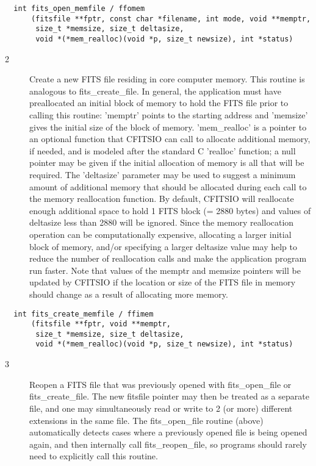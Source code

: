 \documentclass[11pt]{book}
\begin{document}
\begin{verbatim}
  int fits_open_memfile / ffomem
      (fitsfile **fptr, const char *filename, int mode, void **memptr,
       size_t *memsize, size_t deltasize,
       void *(*mem_realloc)(void *p, size_t newsize), int *status)
\end{verbatim}

\begin{description}
\item[2 ] Create a new FITS file residing in core computer memory.  This
routine is analogous to fits\_create\_file.    In general, the
application must have preallocated an initial block of memory to hold
the FITS file prior to calling this routine:  'memptr' points to the
starting address and 'memsize' gives the initial size of the block of
memory.  'mem\_realloc' is a pointer to an optional function that
CFITSIO can call to allocate additional memory, if needed, and is
modeled after the standard C 'realloc' function;  a null pointer may be
given if the initial allocation of memory is all that will be
required.  The 'deltasize' parameter may be used to suggest a minimum
amount of additional memory that should be allocated during each call
to the memory reallocation function.  By default, CFITSIO will
reallocate enough additional space to hold 1 FITS block (= 2880 bytes)
and  values of deltasize less than 2880 will be ignored.  Since the
memory reallocation operation can be computationally expensive,
allocating a larger initial block of memory, and/or specifying a larger
deltasize value may help to reduce the number of reallocation calls
and make the application program run
faster. Note that values of the memptr and memsize pointers will be updated
by CFITSIO if the location or size of the FITS file in memory
should change as a result of allocating more memory. \label{ffimem}
\end{description}

\begin{verbatim}
  int fits_create_memfile / ffimem
      (fitsfile **fptr, void **memptr,
       size_t *memsize, size_t deltasize,
       void *(*mem_realloc)(void *p, size_t newsize), int *status)
\end{verbatim}

\begin{description}
\item[3 ] Reopen a FITS file that was previously opened with
    fits\_open\_file or fits\_create\_file.  The new fitsfile
    pointer may then be treated as a separate file, and one may
    simultaneously read or write to 2 (or more)  different extensions in
    the same file.   The fits\_open\_file routine (above) automatically
    detects cases where a previously opened file is being opened again,
    and then internally call fits\_reopen\_file, so programs should rarely
    need to explicitly call this routine.
\label{ffreopen}
\end{description}
\end{document}
